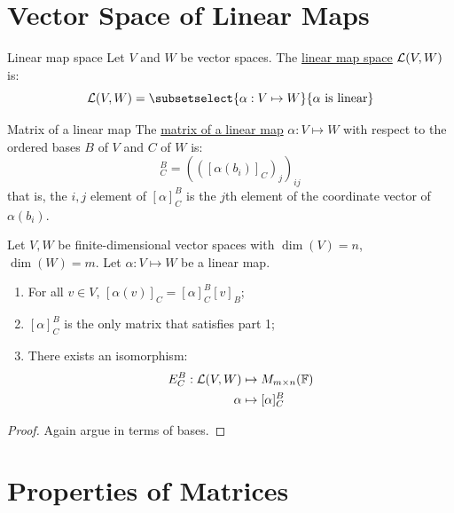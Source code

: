 \documentclass[../Main.tex]{subfiles}
\begin{document}
\section{Vector Space of Linear Maps}
\begin{definition}{Linear map space}
    Let $V$ and $W$ be vector spaces. The \underline{linear map space} $\mathcal{L}(V, W)$ is:
    \begin{equation*}
        \L(V, W) = \subsetselect{\alpha : V \mapsto W}{\alpha \text{ is linear}}
    \end{equation*}
\end{definition}
\begin{definition}{Matrix of a linear map}
    The \underline{matrix of a linear map} $\alpha : V \mapsto W$ with respect to the ordered bases $B$ of $V$ and $C$ of $W$ is:
    \begin{equation*}
        [\alpha]^B_C = \left(\left([\alpha(b_i)]_C\right)_j\right)_{ij}
    \end{equation*}
    that is, the $i, j$ element of $[\alpha]^B_C$ is the $j$th element of the coordinate vector of $\alpha(b_i)$.
\end{definition}
\begin{theorem}
    Let $V, W$ be finite-dimensional vector spaces with $\dim(V) = n$, $\dim(W) = m$. Let $\alpha : V \mapsto W$ be a linear map.
    \begin{enumerate}
        \item For all $v \in V$, $[\alpha(v)]_C = [\alpha]_C^B [v]_B$;
        \item $[\alpha]^B_C$ is the only matrix that satisfies part 1;
        \item There exists an isomorphism:
            \begin{align*}
                E^B_C : \mathcal{L}(V, W) &\mapsto M_{m \times n}(\mathbb{F})\\
                \alpha &\mapsto [\alpha]^B_C
            \end{align*}
    \end{enumerate}
    \label{thmLinMapProps}
\end{theorem}
\begin{proof}
    Again argue in terms of bases.
\end{proof}
\section{Properties of Matrices}
\end{document}
